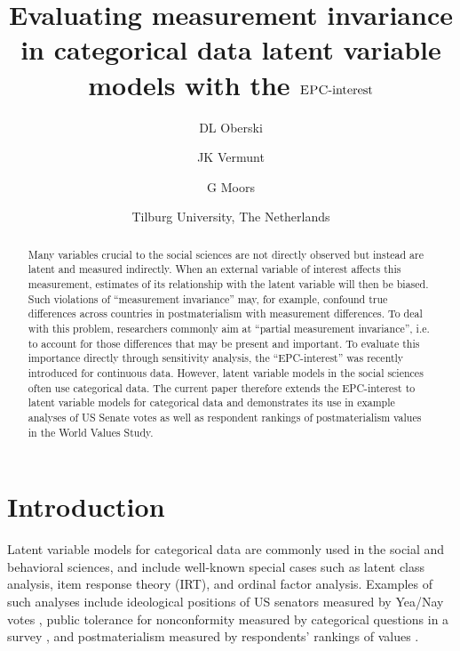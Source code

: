 \documentclass[letterpaper,12pt]{article}
\title{Evaluating measurement invariance in categorical data latent variable models with the  $\textrm{{\sc {EPC}}-interest}$}
\author{DL Oberski \and JK Vermunt \and G Moors}
\date{Tilburg University, The Netherlands}
\begin{document}
\maketitle



\begin{abstract}

Many variables crucial to the social sciences are not directly observed but instead are latent and measured indirectly. When an external variable of interest affects this measurement, estimates of its relationship with the latent variable will then be biased. Such violations of ``measurement invariance'' may, for example, confound true differences across countries in postmaterialism with measurement differences.
To deal with this problem, researchers commonly aim at ``partial measurement invariance'', i.e. to account for those differences that may be present and important. To evaluate this importance directly through sensitivity analysis, the ``EPC-interest''   was recently introduced  for continuous data. However, latent variable models in the social sciences often use categorical data. The current paper therefore extends the EPC-interest to latent variable models for categorical data and demonstrates its use in example analyses of US Senate votes as well as respondent rankings of postmaterialism values in the World Values Study. 
\end{abstract}





\section{Introduction}

\noindent
Latent variable models for categorical data are commonly used in the social and behavioral sciences, and include well-known special cases such as latent class analysis, item response theory (IRT), and ordinal factor analysis. Examples of such analyses include ideological positions of US senators measured by Yea/Nay votes \citep{poole1985spatial}, public tolerance for nonconformity measured by categorical questions in a survey \citep{mccutcheon1985latent}, and  postmaterialism  measured by respondents' rankings of values \citep{inglehart1981post,moors2007heterogeneity}.
\end{document}
